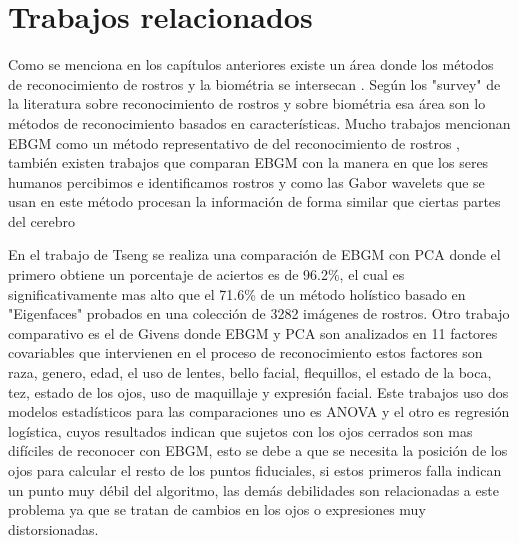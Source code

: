 \chapter{Trabajos relacionados}

Como se menciona en los capítulos anteriores existe un área donde los métodos de reconocimiento de rostros y la biométria se intersecan \cite{}. Según los "survey" de la literatura sobre reconocimiento de rostros \cite{zhao2003face} y sobre biométria\cite{delac2004survey} esa área son lo métodos de reconocimiento basados en características. Mucho trabajos mencionan \ac{EBGM}\cite{wiskott1997face} como un método representativo de del reconocimiento de rostros \cite{}, también existen trabajos que comparan \ac{EBGM} con la manera en que los seres humanos percibimos e identificamos rostros \cite{bruce1998human} y como las Gabor wavelets que se usan en este método procesan la información de forma similar que ciertas partes del cerebro \cite{}

En el trabajo de Tseng \cite{tseng2003comparison} se realiza una comparación de \ac{EBGM} con \ac{PCA} donde el primero obtiene un porcentaje de aciertos es de 96.2\%, el cual es significativamente mas alto que el 71.6\% de un método holístico basado en "Eigenfaces"  probados en una colección de 3282 imágenes de rostros. Otro trabajo comparativo es el de Givens\cite{givens2004features} donde \ac{EBGM} y \ac{PCA} son analizados en 11 factores covariables que intervienen en el proceso de reconocimiento estos factores son raza, genero, edad, el uso de lentes, bello facial, flequillos, el estado de la boca, tez, estado de los ojos, uso de maquillaje y expresión facial. Este trabajos uso dos modelos estadísticos para las comparaciones uno es \ac{ANOVA} y el otro es regresión logística, cuyos resultados indican que sujetos con los ojos cerrados son mas difíciles de reconocer con \ac{EBGM}, esto se debe a que se necesita la posición de los ojos para calcular el resto de los puntos fiduciales, si estos primeros falla indican un punto muy débil del algoritmo, las demás debilidades son relacionadas a este problema ya que se tratan de cambios en los ojos o expresiones muy distorsionadas.

